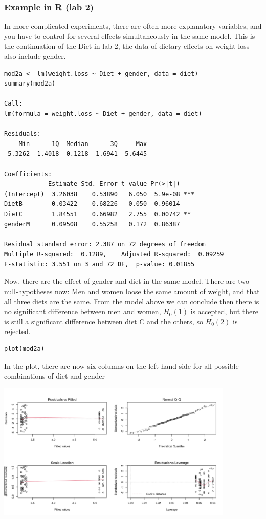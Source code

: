 \documentclass{article}
\begin{document}
\subsubsection{Example in R (lab 2)}
In more complicated experiments, there are often more explanatory variables, and you have to control for several effects simultaneously in the same model. This is the continuation of the Diet in lab 2, the data of dietary effects on weight loss also include gender.\par

\begin{lstlisting}
mod2a <- lm(weight.loss ~ Diet + gender, data = diet)
summary(mod2a)

Call:
lm(formula = weight.loss ~ Diet + gender, data = diet)

Residuals:
    Min      1Q  Median      3Q     Max 
-5.3262 -1.4018  0.1218  1.6941  5.6445 

Coefficients:
            Estimate Std. Error t value Pr(>|t|)    
(Intercept)  3.26038    0.53890   6.050  5.9e-08 ***
DietB       -0.03422    0.68226  -0.050  0.96014    
DietC        1.84551    0.66982   2.755  0.00742 ** 
genderM      0.09508    0.55258   0.172  0.86387    

Residual standard error: 2.387 on 72 degrees of freedom
Multiple R-squared:  0.1289,	Adjusted R-squared:  0.09259 
F-statistic: 3.551 on 3 and 72 DF,  p-value: 0.01855
\end{lstlisting}
Now, there are the effect of gender and diet in the same model. There are two null-hypotheses now: Men and women loose the same amount of weight, and that all three diets are the same. From the model above we can conclude then there is no significant difference between men and women, $H_0(1)$ is accepted, but there is still a significant difference between diet C and the others, so $H_0(2)$ is rejected.\par
\begin{lstlisting}
plot(mod2a)
\end{lstlisting}
In the plot, there are now six columns on the left hand side for all possible combinations of diet and gender
\begin{center}
\includegraphics[width = 0.85\textwidth]{lab3/lm_1.png}
\end{center}
\end{document}
